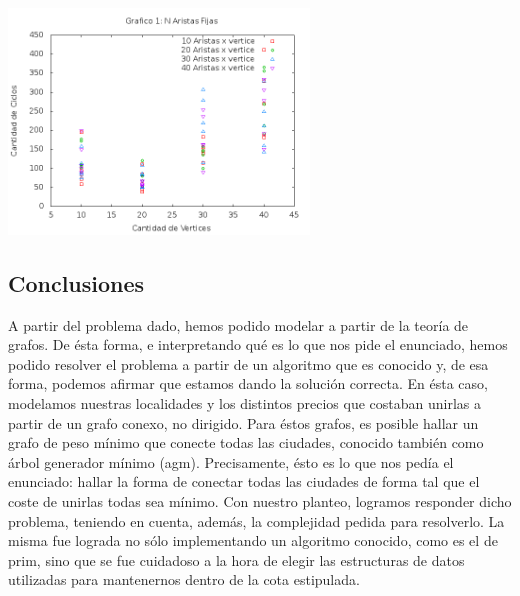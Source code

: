 \begin {center}
\includegraphics[width=8cm]{./graficos/grafico_efijo.png}
\end {center} 


\subsection{Conclusiones}
A partir del problema dado, hemos podido modelar a partir de la teoría de grafos. De ésta forma, e interpretando qué es lo que nos pide el enunciado, hemos podido resolver el problema a partir de un algoritmo que es conocido y, de esa forma, podemos afirmar que estamos dando la solución correcta. 
En ésta caso, modelamos nuestras localidades y los distintos precios que costaban unirlas a partir de un grafo conexo, no dirigido. Para éstos grafos, es posible hallar un grafo de peso mínimo que conecte todas las ciudades, conocido también como árbol generador mínimo (agm). Precisamente, ésto es lo que nos pedía el enunciado: hallar la forma de conectar todas las ciudades de forma tal que el coste de unirlas todas sea mínimo. Con nuestro planteo, logramos responder dicho problema, teniendo en cuenta, además, la complejidad pedida para resolverlo. La misma fue lograda no sólo implementando un algoritmo conocido, como es el de prim, sino que se fue cuidadoso a la hora de elegir las estructuras de datos utilizadas para mantenernos dentro de la cota estipulada.
